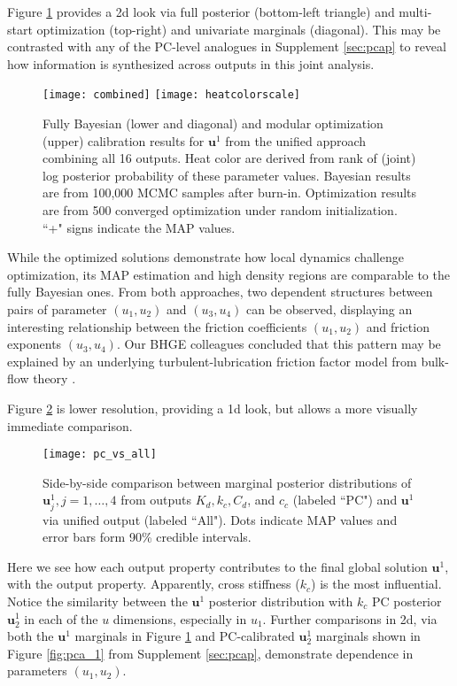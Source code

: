 \documentclass[12pt]{article}
\begin{document}
Figure \ref{fig:comb} provides a 2d look via full posterior (bottom-left
triangle) and multi-start optimization (top-right) and univariate marginals
(diagonal).  This may be contrasted with any of the PC-level analogues in
Supplement \ref{sec:pcap} to reveal how information is synthesized across
outputs in this joint analysis.
\begin{figure}[ht!]
\centering
\centering
\texttt{[image: combined]}
\texttt{[image: heatcolorscale]}
\caption{Fully Bayesian (lower and diagonal) and modular optimization (upper)
calibration results for  $\mathbf{u}^1$ from the unified approach combining
all 16 outputs. Heat color are derived from rank of (joint) log posterior
probability of these parameter values. Bayesian results are from 100,000 MCMC
samples after burn-in. Optimization results are from  500 converged
optimization under random initialization. ``+" signs indicate the MAP values.}
\label{fig:comb}%
\end{figure}
While the optimized solutions demonstrate how local dynamics challenge
optimization, its MAP estimation and high density regions are comparable to
the fully Bayesian ones. From both approaches, two dependent structures
between pairs of parameter $(u_1, u_2)$ and $(u_3, u_4)$ can be observed,
displaying an interesting relationship between the friction coefficients
$(u_1, u_2)$ and friction exponents $(u_3, u_4)$. Our BHGE colleagues
concluded that this pattern may be explained by an underlying
turbulent-lubrication friction factor model from bulk-flow theory
\citep{Hirs:1973}.

Figure \ref{fig:pcandall} is lower resolution, providing a 1d look, but allows
a more visually immediate comparison.
\begin{figure}[ht!]
\centering
\texttt{[image: pc\_vs\_all]}
\caption{Side-by-side comparison between marginal posterior distributions of 
$\mathbf{u}^1_j, j = 1, \dots, 4$  from outputs $K_d, k_c, C_d$,
and $c_c$ (labeled ``PC") and $\mathbf{u}^1$ via unified output (labeled ``All"). Dots
indicate MAP values and error bars form 90\% credible intervals. }
\label{fig:pcandall}
\end{figure}
Here we see how each output property contributes to the final global solution
$\mathbf{u}^1$, with the output property.  Apparently, cross stiffness ($k_c$) is
the most influential. Notice  the similarity between the $\mathbf{u}^1$
posterior distribution with $k_c$ PC posterior  $\mathbf{u}^1_2$ in each of
the $u$ dimensions, especially in $u_1$. Further comparisons in 2d, via both
the $\mathbf{u}^1$ marginals in Figure \ref{fig:comb}  and PC-calibrated
$\mathbf{u}^1_2$ marginals shown in Figure  \ref{fig:pca_1} from  Supplement
\ref{sec:pcap}, demonstrate dependence in parameters $(u_1, u_2)$.
\end{document}
